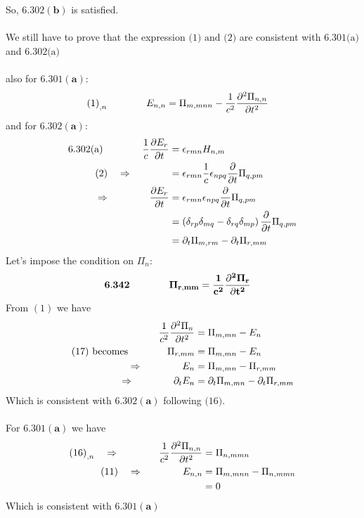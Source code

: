So, $\mathbf{6.302(b)}$ is satisfied.\\\\
We still have to prove that the expression $\text{(1) and (2)}$ are consistent with $\text{6.301(a)}$ and $\text{6.302(a)}$\\\\
also for $\mathbf{6.301(a)}$:
\begin{align}
\text{(1)}_{,n}\quad\quad\quad\quad E_{n,n} &= \Pi_{m,mnn}-\frac{1}{c^2}\frac{\partial^2 \Pi_{n,n}}{\partial t^2}
\end{align}
and for $\mathbf{6.302(a)}$:
\begin{align}
\text{6.302(a)}\quad\quad\quad\quad \frac{1}{c}\frac{\partial E_r}{\partial t}&= \epsilon_{rmn}H_{n,m}\\
\text{(2)}\quad \Rightarrow\quad\quad\quad\quad&= \epsilon_{rmn}\frac{1}{c}\epsilon_{npq}\frac{\partial}{\partial t}\Pi_{q,pm}\\
\Rightarrow\quad\quad\quad\quad \frac{\partial E_r}{\partial t}&= \epsilon_{rmn}\epsilon_{npq}\frac{\partial}{\partial t}\Pi_{q,pm}\\
&= \left(\delta_{rp}\delta_{mq}-\delta_{rq}\delta_{mp}\right)\frac{\partial}{\partial t}\Pi_{q,pm}\\
&= \partial_t\Pi_{m,rm}-\partial_t\Pi_{r,mm}
\end{align}
Let's impose the condition on $\Pi_n$:
\begin{align}
\mathbf{6.342} \quad\quad\quad\quad &\mathbf{\Pi_{r,mm}=\frac{1}{c^2}\frac{\partial^2 \Pi_r}{\partial t^2}}
\end{align}
From $(1)$ we have
\begin{align}
\frac{1}{c^2}\frac{\partial^2 \Pi_n}{\partial t^2}&=\Pi_{m,mn}-E_n\\
\text{(17) becomes}\quad\quad\quad\quad  \Pi_{r,mm}&=\Pi_{m,mn}-E_n\\
\Rightarrow\quad\quad\quad\quad E_n &= \Pi_{m,mn}-\Pi_{r,mm}\\
\Rightarrow\quad\quad\quad\quad \partial_tE_n &=\partial_t\Pi_{m,mn}- \partial_t\Pi_{r,mm}
\end{align}
Which is consistent with $\mathbf{6.302(a)}$ following $\text{(16)}$.\\\\

For $\mathbf{6.301(a)}$ we have
\begin{align}
\text{(16)}_{,n}\quad\Rightarrow\quad\quad\quad\quad \frac{1}{c^2}\frac{\partial^2 \Pi_{n,n}}{\partial t^2}&=\Pi_{n,mmn}\\
\text{(11)}\quad\Rightarrow\quad\quad\quad\quad E_{n,n} &= \Pi_{m,mnn}-\Pi_{n,mmn}\\
&=0
\end{align}
Which is consistent with $\mathbf{6.301(a)}$\\\\

